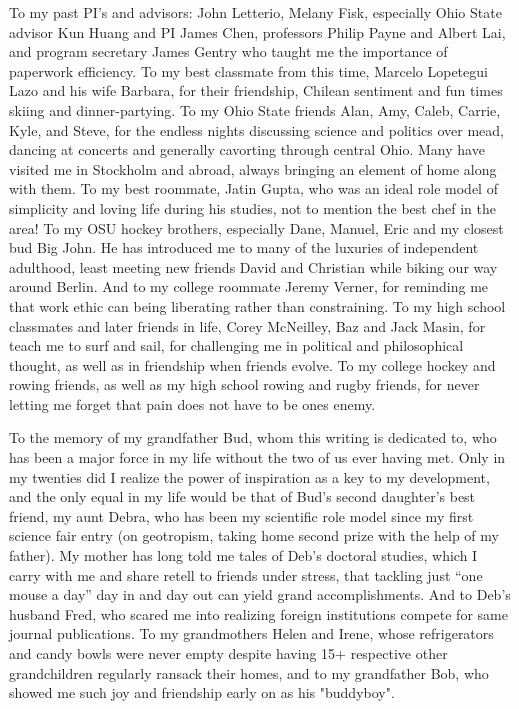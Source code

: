 To my past PI's and advisors: John Letterio, Melany Fisk, especially Ohio State advisor Kun Huang and PI James Chen, professors Philip Payne and Albert Lai, and program secretary James Gentry who taught me the importance of paperwork efficiency. To my best classmate from this time, Marcelo Lopetegui Lazo and his wife Barbara, for their friendship, Chilean sentiment and fun times skiing and dinner-partying. To my Ohio State friends Alan, Amy, Caleb, Carrie, Kyle, and Steve, for the endless nights discussing science and politics over mead, dancing at concerts and generally cavorting through central Ohio. Many have visited me in Stockholm and abroad, always bringing an element of home along with them. To my best roommate, Jatin Gupta, who was an ideal role model of simplicity and loving life during his studies, not to mention the best chef in the area! To my OSU hockey brothers, especially Dane, Manuel, Eric and my closest bud Big John. He has introduced me to many of the luxuries of independent adulthood, least meeting new friends David and Christian while biking our way around Berlin. And to my college roommate Jeremy Verner, for reminding me that work ethic can being liberating rather than constraining. To my high school classmates and later friends in life, Corey McNeilley, Baz and Jack Masin, for teach me to surf and sail, for challenging me in political and philosophical thought, as well as in friendship when friends evolve. To my college hockey and rowing friends, as well as my high school rowing and rugby friends, for never letting me forget that pain does not have to be ones enemy.

To the memory of my grandfather Bud, whom this writing is dedicated to, who has been a major force in my life without the two of us ever having met. Only in my twenties did I realize the power of inspiration as a key to my development, and the only equal in my life would be that of Bud's second daughter's best friend, my aunt Debra, who has been my scientific role model since my first science fair entry (on geotropism, taking home second prize with the help of my father). My mother has long told me tales of Deb's doctoral studies, which I carry with me and share retell to friends under stress, that tackling just ``one mouse a day'' day in and day out can yield grand accomplishments. And to Deb's husband Fred, who scared me into realizing foreign institutions compete for same journal publications. To my grandmothers Helen and Irene, whose refrigerators and candy bowls were never empty despite having 15+ respective other grandchildren regularly ransack their homes, and to my grandfather Bob, who showed me such joy and friendship early on as his "buddyboy".

